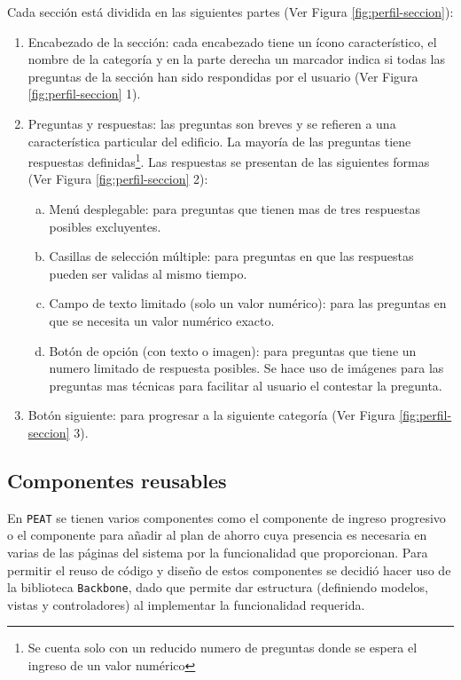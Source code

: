 Cada sección está dividida en las siguientes partes (Ver Figura
\ref{fig:perfil-seccion}):
\begin{enumerate}
\item Encabezado de la sección: cada encabezado tiene un ícono característico,
  el nombre de la categoría y en la parte derecha un marcador indica
  si todas las preguntas de la sección han sido respondidas por el usuario
  (Ver Figura \ref{fig:perfil-seccion} 1).
\item Preguntas y respuestas: las preguntas son breves y se refieren a una
  característica particular del edificio. La mayoría de las preguntas
  tiene respuestas definidas\footnote{Se cuenta solo con un reducido numero de
    preguntas donde se espera el ingreso de un valor numérico}. Las respuestas se
  presentan de las siguientes formas (Ver Figura \ref{fig:perfil-seccion} 2):
  \begin{enumerate}[a)]
  \item Menú desplegable: para preguntas que tienen mas de tres respuestas
    posibles excluyentes.
  \item Casillas de selección múltiple: para preguntas en que las respuestas
    pueden ser validas al mismo tiempo.
  \item Campo de texto limitado (solo un valor numérico): para las preguntas
    en que se necesita un valor numérico exacto.
  \item Botón de opción (con texto o imagen): para preguntas que tiene un
    numero limitado de respuesta posibles. Se hace uso de imágenes para las
    preguntas mas técnicas para facilitar al usuario el contestar la pregunta.
  \end{enumerate}
\item Botón siguiente: para progresar a la siguiente categoría (Ver Figura \ref{fig:perfil-seccion} 3).
\end{enumerate}


\subsection{Componentes reusables}
\label{subsec:componentes}

En \texttt{PEAT} se tienen varios componentes como el componente de ingreso
progresivo o el componente para añadir al plan de ahorro cuya presencia es necesaria
en varias de las páginas del sistema por la funcionalidad que proporcionan.
Para permitir el reuso de código y diseño de estos componentes se decidió hacer uso
de la biblioteca \texttt{Backbone}, dado que permite dar estructura (definiendo
modelos, vistas y controladores) al implementar la funcionalidad requerida.


